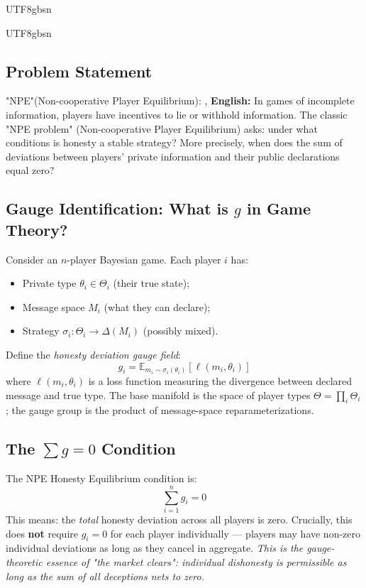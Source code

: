 \documentclass[11pt,a4paper]{article}
\newcommand{\EE}{\mathbb{E}}
\begin{document}
\begin{CJK}{UTF8}{gbsn}
{\begin{CJK}{UTF8}{gbsn}
\subsection{Problem Statement}
\noindent
"NPE"(Non-cooperative Player Equilibrium): , 
\vspace{0.3cm}
\noindent
\textbf{English:} In games of incomplete information, players have incentives to
lie or withhold information. The classic "NPE problem" (Non-cooperative Player
Equilibrium) asks: under what conditions is honesty a stable strategy? More precisely,
when does the sum of deviations between players' private information and their public
declarations equal zero?
\subsection{Gauge Identification: What is $g$ in Game Theory?}
Consider an $n$-player Bayesian game. Each player $i$ has:
\begin{itemize}
    \item Private type $\theta_i \in \Theta_i$ (their true state);
    \item Message space $M_i$ (what they can declare);
    \item Strategy $\sigma_i: \Theta_i \to \Delta(M_i)$ (possibly mixed).
\end{itemize}
Define the \textit{honesty deviation gauge field}:
\begin{equation}
    g_i = \EE_{m_i \sim \sigma_i(\theta_i)}\left[ \ell(m_i, \theta_i) \right]
\end{equation}
where $\ell(m_i, \theta_i)$ is a loss function measuring the divergence between
declared message and true type. The base manifold is the space of player types
$\Theta = \prod_i \Theta_i$; the gauge group is the product of message-space
reparameterizations.
\subsection{The $\sum g = 0$ Condition}
The NPE Honesty Equilibrium condition is:
\begin{equation}
    \boxed{\sum_{i=1}^n g_i = 0}
\end{equation}
This means: the \textit{total} honesty deviation across all players is zero. Crucially,
this does \textbf{not} require $g_i = 0$ for each player individually --- players may
have non-zero individual deviations as long as they cancel in aggregate.
\textit{This is the gauge-theoretic essence of "the market clears": individual dishonesty
is permissible as long as the sum of all deceptions nets to zero.}

\end{CJK}}
\end{CJK}
\end{document}
